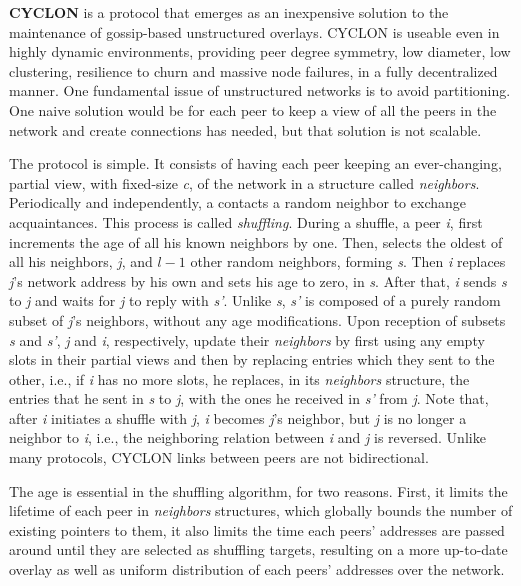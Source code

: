\documentclass[runningheads]{llncs}
\begin{document}
\textbf{CYCLON} \cite{cyclon} is a protocol that emerges as an inexpensive solution to the maintenance of gossip-based unstructured overlays. CYCLON is useable even in highly dynamic environments, providing peer degree symmetry, low diameter, low clustering, resilience to churn and massive node failures, in a fully decentralized manner. One fundamental issue of unstructured networks is to avoid partitioning. One naive solution would be for each peer to keep a view of all the peers in the network and create connections has needed, but that solution is not scalable.

The protocol is simple. It consists of having each peer keeping an ever-changing, partial view, with fixed-size \textit{c}, of the network in a structure called \textit{neighbors}. Periodically and independently, a contacts a random neighbor to exchange acquaintances. This process is called \textit{shuffling}. During a shuffle, a peer \textit{i}, first increments the age of all his known neighbors by one. Then, selects the oldest of all his neighbors, \textit{j}, and $l-1$ other random neighbors, forming \textit{s}. Then \textit{i} replaces \textit{j}'s network address by his own and sets his age to zero, in \textit{s}. After that, \textit{i} sends \textit{s} to \textit{j} and waits for \textit{j} to reply with \textit{s'}. Unlike \textit{s}, \textit{s'} is composed of a purely random subset of \textit{j}'s neighbors, without any age modifications. Upon reception of subsets \textit{s} and \textit{s'}, \textit{j} and \textit{i}, respectively, update their \textit{neighbors} by first using any empty slots in their partial views and then by replacing entries which they sent to the other, i.e., if \textit{i} has no more slots, he replaces, in its \textit{neighbors} structure, the entries that he sent in \textit{s} to \textit{j}, with the ones he received in \textit{s'} from \textit{j}. Note that, after \textit{i} initiates a shuffle with \textit{j}, \textit{i} becomes \textit{j}'s neighbor, but \textit{j} is no longer a neighbor to \textit{i}, i.e., the neighboring relation between \textit{i} and \textit{j} is reversed. Unlike many protocols, CYCLON links between peers are not bidirectional.

The age is essential in the shuffling algorithm, for two reasons. First, it limits the lifetime of each peer in \textit{neighbors} structures, which globally bounds the number of existing pointers to them, it also limits the time each peers' addresses are passed around until they are selected as shuffling targets, resulting on a more up-to-date overlay as well as uniform distribution of each peers' addresses over the network.
\end{document}
